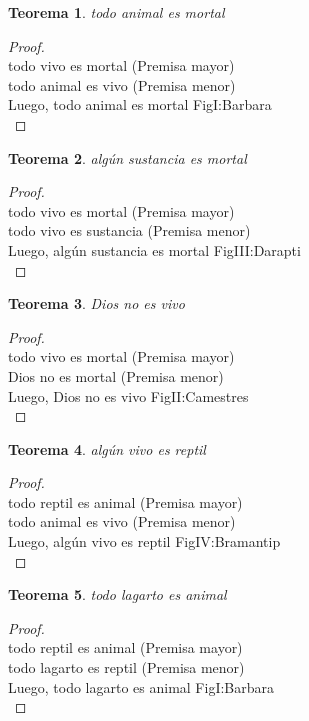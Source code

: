 ﻿\documentclass[12pt]{book}
\newtheorem{theorem}{Teorema}[chapter]
\newtheorem{proof}{Demostración}
\begin{document}
\begin{theorem}
todo animal es mortal
\label{th: 27}
\end{theorem}\begin{proof}\\todo vivo es mortal	 (Premisa mayor) \\todo animal es vivo	 (Premisa menor) \\Luego, todo animal es mortal	FigI:Barbara \\ \end{proof}
\begin{theorem}
algún sustancia es mortal
\label{th: 28}
\end{theorem}\begin{proof}\\todo vivo es mortal	 (Premisa mayor) \\todo vivo es sustancia	 (Premisa menor) \\Luego, algún sustancia es mortal	FigIII:Darapti \\ \end{proof}
\begin{theorem}
Dios no es vivo
\label{th: 29}
\end{theorem}\begin{proof}\\todo vivo es mortal	 (Premisa mayor) \\Dios no es mortal	 (Premisa menor) \\Luego, Dios no es vivo	FigII:Camestres \\ \end{proof}
\begin{theorem}
algún vivo es reptil
\label{th: 30}
\end{theorem}\begin{proof}\\todo reptil es animal	 (Premisa mayor) \\todo animal es vivo	 (Premisa menor) \\Luego, algún vivo es reptil	FigIV:Bramantip \\ \end{proof}
\begin{theorem}
todo lagarto es animal
\label{th: 31}
\end{theorem}\begin{proof}\\todo reptil es animal	 (Premisa mayor) \\todo lagarto es reptil	 (Premisa menor) \\Luego, todo lagarto es animal	FigI:Barbara \\ \end{proof}
\end{document}
